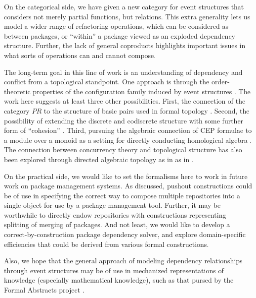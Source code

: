 \documentclass[hoptionsi,review,screen,format=sigconf]{acmart}
\theoremstyle{definition}
\newcommand{\PRb}{\mathit{PR}}
\begin{document}
On the categorical side, we have given a new category for event structures that considers not merely partial functions, but relations. This extra generality lets us model a wider range of refactoring operations, which can be considered as between packages, or ``within'' a package viewed as an exploded dependency structure. Further, the lack of general coproducts highlights important issues in what sorts of operations can and cannot compose. 

The long-term goal in this line of work is an understanding of dependency and conflict from a topological standpoint. One approach is through the order-theoretic properties of the configuration family induced by event structures \cite{bazerman2020topological}. The work here suggests at least three other possibilities. First, the connection of the category \(\PRb\) to the structure of basic pairs used in formal topology \cite{sambin1998preview}. Second, the possibility of extending the discrete and codiscrete structure with some further form of ``cohesion'' \cite{lawvere2007axiomatic}. Third, pursuing the algebraic connection of CEP formulae to a module over a monoid as a setting for directly conducting homological algebra \cite{anderson2012rings}. The connection between concurrency theory and topological structure has also been explored through directed algebraic topology as in as in \cite{fajstrup2016directed}.

On the practical side, we would like to set the formalisms here to work in future work on package management systems. As discussed, pushout constructions could be of use in specifying the correct way to compose multiple repositories into a single object for use by a package management tool. Further, it may be worthwhile to directly endow repositories with constructions representing splitting of merging of packages. And not least, we would like to develop a correct-by-construction package dependency solver, and explore domain-specific efficiencies that could be derived from various formal constructions.

Also, we hope that the general approach of modeling dependency relationships through event structures may be of use in mechanized representations of knowledge (especially mathematical knowledge), such as that pursed by the Formal Abstracts project \cite{fabstract}. 
\end{document}
